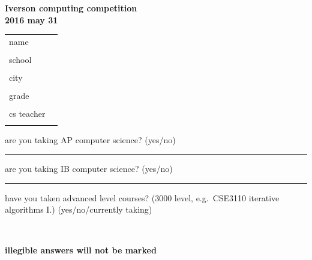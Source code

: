\documentclass[12pt]{article}
\begin{document}
\thispagestyle{empty}

\begin{LARGE}
\begin{center}
\textbf{Iverson computing competition} \\
\textbf{2016 may 31} \\
\end{center}
\end{LARGE}

\vspace{0.5cm}

\noindent
{\large
\begin{tabular}{ll}
name &\underline{\hspace{8cm}} \\ \\
school &\underline{\hspace{8cm}} \\ \\
city &	\underline{\hspace{4cm}}  \\ \\
grade &	\underline{\hspace{2cm}}  \\ \\
cs teacher &	\underline{\hspace{8cm}}  \\ \\
\end{tabular}
}

\bigskip

{\large 
\noindent
are you taking AP computer science? (yes/no) \rule{1cm}{.5pt}

\noindent
are you taking IB computer science? (yes/no) \rule{1cm}{.5pt}

\medskip

\noindent have you taken advanced level courses? 
(3000 level, e.g.\ CSE3110 iterative algorithms I.)
(yes/no/currently taking) \rule[0mm]{0mm}{6mm} \ \ \hrulefill \ \ 
}

\vfill


\begin{center}
\bf \large
\noindent illegible answers will not be marked

\end{center}

\vfill
 
\end{document}

